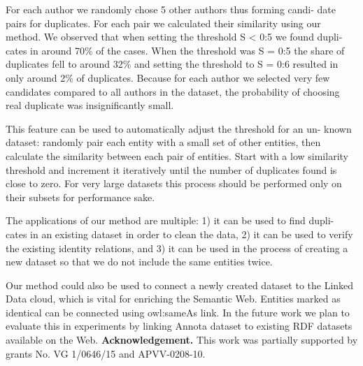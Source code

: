 \documentclass{llncs}
\begin{document}
For each author we randomly chose 5 other authors thus forming candi-
date pairs for duplicates. For each pair we calculated their similarity using our
method. We observed that when setting the threshold S < 0:5 we found dupli-
cates in around 70\% of the cases. When the threshold was S = 0:5 the share
of duplicates fell to around 32\% and setting the threshold to S = 0:6 resulted
in only around 2\% of duplicates. Because for each author we selected very few
candidates compared to all authors in the dataset, the probability of choosing
real duplicate was insignificantly small.

This feature can be used to automatically adjust the threshold for an un-
known dataset: randomly pair each entity with a small set of other entities, then
calculate the similarity between each pair of entities. Start with a low similarity
threshold and increment it iteratively until the number of duplicates found is
close to zero. For very large datasets this process should be performed only on
their subsets for performance sake.

The applications of our method are multiple: 1) it can be used to find dupli-
cates in an existing dataset in order to clean the data, 2) it can be used to verify
the existing identity relations, and 3) it can be used in the process of creating a
new dataset so that we do not include the same entities twice.

Our method could also be used to connect a newly created dataset to the
Linked Data cloud, which is vital for enriching the Semantic Web. Entities
marked as identical can be connected using owl:sameAs link. In the future work
we plan to evaluate this in experiments by linking Annota dataset to existing
RDF datasets available on the Web.
\newline
\newline
\textbf{Acknowledgement.} This work was partially supported by grants No. VG
1/0646/15 and APVV-0208-10.
 


\end{document}
